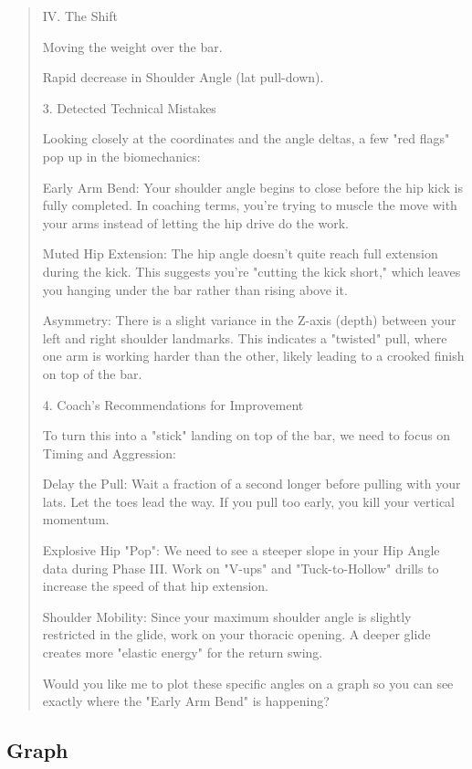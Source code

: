 \begin{quote}
    IV. The Shift
    
    Moving the weight over the bar.
    
    Rapid decrease in Shoulder Angle (lat pull-down).
    
    3. Detected Technical Mistakes
    
    Looking closely at the coordinates and the angle deltas, a few "red flags" pop up in the biomechanics:
    
    Early Arm Bend: Your shoulder angle begins to close before the hip kick is fully completed. In coaching terms, you’re trying to muscle the move with your arms instead of letting the hip drive do the work.
    
    Muted Hip Extension: The hip angle doesn't quite reach full extension during the kick. This suggests you're "cutting the kick short," which leaves you hanging under the bar rather than rising above it.
    
    Asymmetry: There is a slight variance in the Z-axis (depth) between your left and right shoulder landmarks. This indicates a "twisted" pull, where one arm is working harder than the other, likely leading to a crooked finish on top of the bar.
    
    4. Coach’s Recommendations for Improvement
    
    To turn this into a "stick" landing on top of the bar, we need to focus on Timing and Aggression:
    
    Delay the Pull: Wait a fraction of a second longer before pulling with your lats. Let the toes lead the way. If you pull too early, you kill your vertical momentum.
    
    Explosive Hip "Pop": We need to see a steeper slope in your Hip Angle data during Phase III. Work on "V-ups" and "Tuck-to-Hollow" drills to increase the speed of that hip extension.
    
    Shoulder Mobility: Since your maximum shoulder angle is slightly restricted in the glide, work on your thoracic opening. A deeper glide creates more "elastic energy" for the return swing.
    
    Would you like me to plot these specific angles on a graph so you can see exactly where the "Early Arm Bend" is happening?
\end{quote}

\newpage
\subsection{Graph}

